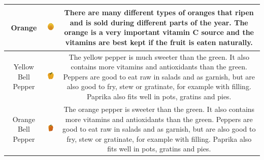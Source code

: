 \begin{table}[!ht]
{\begin{tabular}{c c c}
         \toprule
         \multicolumn{1}{p{1.5cm}}{\vspace{-15mm} {\footnotesize Orange} } & 
          \includegraphics[width=21mm, height=21mm]{PaperB/appendix/figures/iconic_images/Orange_Clean.jpg}  & 
         \multicolumn{1}{p{12cm}}{\vspace{-17mm} {\footnotesize There are many different types of oranges that ripen and is sold during different parts of the year. The orange is a very important vitamin C source and the vitamins are best kept if the fruit is eaten naturally.} } \\
         
        \toprule
         \multicolumn{1}{p{1.5cm}}{\vspace{-15mm} {\footnotesize Yellow Bell Pepper} } & 
          \includegraphics[width=21mm, height=21mm]{PaperB/appendix/figures/iconic_images/Yellow-Pepper_Clean.jpg}  &  
         \multicolumn{1}{p{12cm}}{\vspace{-19mm} {\footnotesize The yellow pepper is much sweeter than the green. It also contains more vitamins and antioxidants than the green. Peppers are good to eat raw in salads and as garnish, but are also good to fry, stew or gratinate, for example with filling. Paprika also fits well in pots, gratins and pies.} } \\
         
         \toprule
         \multicolumn{1}{p{1.5cm}}{\vspace{-15mm} {\footnotesize Orange Bell Pepper} } & 
          \includegraphics[width=21mm, height=21mm]{PaperB/appendix/figures/iconic_images/Orange-Bell-Pepper_Iconic.jpg}  & 
         \multicolumn{1}{p{12cm}}{\vspace{-17mm} {\footnotesize The orange pepper is sweeter than the green. It also contains more vitamins and antioxidants than the green. Peppers are good to eat raw in salads and as garnish, but are also good to fry, stew or gratinate, for example with filling. Paprika also fits well in pots, gratins and pies.} } \\
         

\end{tabular}}
\end{table}
